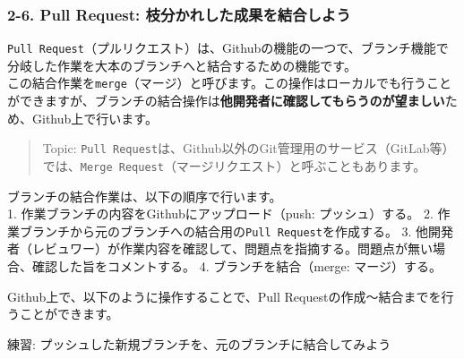 \subsubsection{2-6. Pull Request:
枝分かれした成果を結合しよう}\label{pull-request-ux679dux5206ux304bux308cux3057ux305fux6210ux679cux3092ux7d50ux5408ux3057ux3088ux3046}

\begin{Shaded}
\begin{Highlighting}[]


\end{Highlighting}
\end{Shaded}

\texttt{Pull\ Request}（プルリクエスト）は、Githubの機能の一つで、ブランチ機能で分岐した作業を大本のブランチへと結合するための機能です。\\
この結合作業を\texttt{merge}（マージ）と呼びます。この操作はローカルでも行うことができますが、ブランチの結合操作は\textbf{他開発者に確認してもらうのが望ましい}ため、Github上で行います。

\begin{quote}
Topic:
\texttt{Pull\ Request}は、Github以外のGit管理用のサービス（GitLab等）では、\texttt{Merge\ Request}（マージリクエスト）と呼ぶこともあります。
\end{quote}

ブランチの結合作業は、以下の順序で行います。\\
1. 作業ブランチの内容をGithubにアップロード（push: プッシュ）する。 2.
作業ブランチから元のブランチへの結合用の\texttt{Pull\ Request}を作成する。
3.
他開発者（レビュワー）が作業内容を確認して、問題点を指摘する。問題点が無い場合、確認した旨をコメントする。
4. ブランチを結合（merge: マージ）する。

Github上で、以下のように操作することで、Pull
Requestの作成〜結合までを行うことができます。

練習: プッシュした新規ブランチを、元のブランチに結合してみよう

